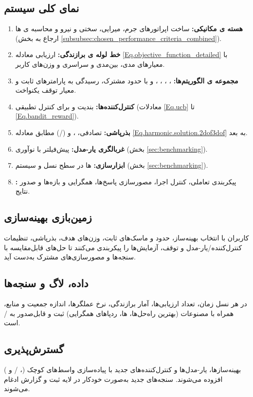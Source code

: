 \subsection{نمای کلی سیستم}
\begin{enumerate}
    \item \textbf{هسته ی مکانیکی:} ساخت اپراتورهای جرم، میرایی، سختی و نیرو و محاسبه ی ‌ها (ارجاع به بخش \ref{subsubsec:chosen_performance_criteria_combined}).
    \item \textbf{خط لوله ی برازندگی:} ارزیابی معادله \eqref{Eq.objective_function_detailed} با معیارهای مدی، بین‌مدی و سراسری و وزن‌های کاربر.
    \item \textbf{مجموعه ی الگوریتم‌ها:} ، ، ، ،  و  با حدود مشترک، رسیدگی به پارامترهای ثابت و معیار توقف یکنواخت.
    \item \textbf{کنترل‌کننده‌ها:} بندیت  و  برای کنترل تطبیقی  (معادلات \ref{Eq.ucb} تا \ref{Eq.bandit_reward}).
    \item \textbf{بذرپاشی:} تصادفی، ،  و  (/) مطابق معادله \eqref{Eq.harmonic.solution.2dof3dof} به بعد.
    \item \textbf{غربالگری یار-مدل:} پیش‌فیلتر  با نوآوری (بخش \ref{sec:benchmarking}).
    \item \textbf{ابزارسازی:} ‌ها در سطح نسل و سیستم (بخش \ref{sec:benchmarking}).
    \item \textbf{:} پیکربندی تعاملی، کنترل اجرا، مصورسازی پاسخ‌ها، همگرایی و بازه‌ها و صدور نتایج.
\end{enumerate}

\subsection{زمین‌بازی بهینه‌سازی}
کاربران با انتخاب بهینه‌ساز، حدود و ماسک‌های ثابت، وزن‌های هدف، بذرپاشی، تنظیمات کنترل‌کننده/یار-مدل و توقف، آزمایش‌ها را پیکربندی می‌کنند تا حل‌های قابل‌مقایسه با سنجه‌ها و مصورسازی‌های مشترک به‌دست آید.

\subsection{داده، لاگ و سنجه‌ها}
در هر نسل زمان، تعداد ارزیابی‌ها، آمار برازندگی، نرخ عملگرها، اندازه جمعیت و منابع، همراه با مصنوعات (بهترین راه‌حل‌ها، ‌ها، ردپاهای همگرایی) ثبت و قابل‌صدور به / است.

\subsection{گسترش‌پذیری}
بهینه‌سازها، یار-مدل‌ها و کنترل‌کننده‌های جدید با پیاده‌سازی واسط‌های کوچک (، / و ) افزوده می‌شوند. سنجه‌های جدید به‌صورت خودکار در لایه ثبت و گزارش ادغام می‌شوند.

